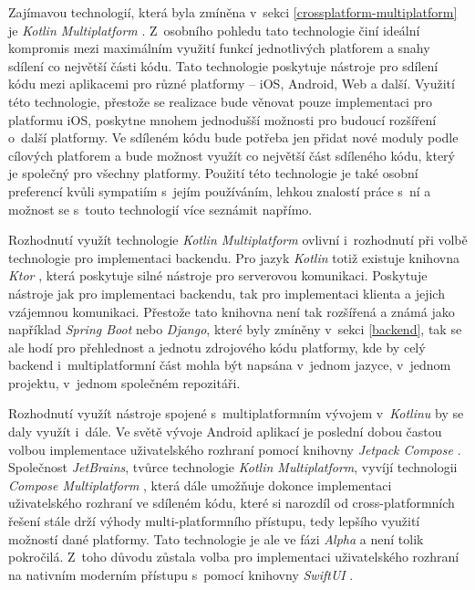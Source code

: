 Zajímavou technologií, která byla zmíněna v~sekci \ref{crossplatform-multiplatform} je \emph{Kotlin Multiplatform} \cite{kotlin-multiplatform}. Z~osobního pohledu tato technologie činí ideální kompromis mezi maximálním využití funkcí jednotlivých platforem a snahy sdílení co největší části kódu. Tato technologie poskytuje nástroje pro sdílení kódu mezi aplikacemi pro různé platformy – iOS, Android, Web a další. Využití této technologie, přestože se realizace bude věnovat pouze implementaci pro platformu iOS, poskytne mnohem jednodušší možnosti pro budoucí rozšíření o~další platformy. Ve sdíleném kódu bude potřeba jen přidat nové moduly podle cílových platforem a bude možnost využít co největší část sdíleného kódu, který je společný pro všechny platformy. Použití této technologie je také osobní preferencí kvůli sympatiím s~jejím používáním, lehkou znalostí práce s~ní a možnost se s~touto technologií více seznámit napřímo.

Rozhodnutí využít technologie \emph{Kotlin Multiplatform} ovlivní i~rozhodnutí při volbě technologie pro implementaci backendu. Pro jazyk \emph{Kotlin} totiž existuje knihovna \emph{Ktor} \cite{ktor}, která poskytuje silné nástroje pro serverovou komunikaci. Poskytuje nástroje jak pro implementaci backendu, tak pro implementaci klienta a jejich vzájemnou komunikaci. Přestože tato knihovna není tak rozšířená a známá jako například \emph{Spring Boot} nebo \emph{Django}, které byly zmíněny v~sekci \ref{backend}, tak se ale hodí pro přehlednost a jednotu zdrojového kódu platformy, kde by celý backend i~multiplatformní část mohla být napsána v~jednom jazyce, v~jednom projektu, v~jednom společném repozitáři.

Rozhodnutí využít nástroje spojené s~multiplatformním vývojem v~\emph{Kotlinu} by se daly využít i~dále. Ve světě vývoje Android aplikací je poslední dobou častou volbou implementace uživatelského rozhraní pomocí knihovny \emph{Jetpack Compose} \cite{compose-ui}. Společnost \emph{JetBrains}, tvůrce technologie \emph{Kotlin Multiplatform}, vyvíjí technologii \emph{Compose Multiplatform} \cite{compose-multiplatform}, která dále umožňuje dokonce implementaci uživatelského rozhraní ve sdíleném kódu, které si narozdíl od cross-platformních řešení stále drží výhody multi-platformního přístupu, tedy lepšího využití možností dané platformy. Tato technologie je ale ve fázi \emph{Alpha} a není tolik pokročilá. Z~toho důvodu zůstala volba pro implementaci uživatelského rozhraní na nativním moderním přístupu s~pomocí knihovny \emph{SwiftUI} \cite{swiftui}.


